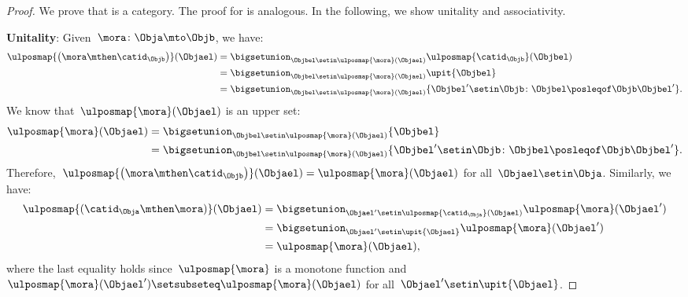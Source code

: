 \begin{proof}
    We prove that \UPos is a category.
    The proof for \LPos is analogous.
    In the following, we show unitality and associativity.

    \textbf{Unitality}:
    Given~$\mora\colon \Obja \mto \Objb$, we have:
    \begin{equation*}
        \begin{aligned}
            \ulposmap{\left( \mora \mthen \catid_\Objb\right)}(\Objael) & =\bigsetunion_{\Objbel\setin \ulposmap{\mora}(\Objael)}\ulposmap{\catid_\Objb}(\Objbel) \\
                                                                        & =\bigsetunion_{\Objbel\setin \ulposmap{\mora}(\Objael)}\upit\{\Objbel\} \\
                                                                        & =\bigsetunion_{\Objbel\setin \ulposmap{\mora}(\Objael)}\{\Objbel'\setin \Objb \colon \Objbel\posleqof\Objb \Objbel' \}.
        \end{aligned}
    \end{equation*}
    We know that~$\ulposmap{\mora}(\Objael)$ is an upper set:
    \begin{equation*}
        \begin{aligned}
            \ulposmap{\mora}(\Objael) & =\bigsetunion_{\Objbel\setin \ulposmap{\mora}(\Objael)}\{\Objbel\} \\
                                      & =\bigsetunion_{\Objbel\setin \ulposmap{\mora}(\Objael)}\{ \Objbel'\setin \Objb \colon \Objbel\posleqof\Objb \Objbel'\}.
        \end{aligned}
    \end{equation*}
    Therefore,~$\ulposmap{\left( \mora \mthen \catid_\Objb\right)}(\Objael)=\ulposmap{\mora}(\Objael)$ for all~$\Objael\setin \Obja$.
    Similarly, we have:
    \begin{equation*}
        \begin{aligned}
            \ulposmap{(\catid_\Obja \mthen \mora)}(\Objael) & =\bigsetunion_{\Objael'\setin \ulposmap{\catid_\Obja}(\Objael)}\ulposmap{\mora}(\Objael') \\
                                                            & =\bigsetunion_{\Objael'\setin \upit \{\Objael\}}\ulposmap{\mora}(\Objael') \\
                                                            & =\ulposmap{\mora}(\Objael),
        \end{aligned}
    \end{equation*}
    where the last equality holds since~$\ulposmap{\mora}$ is a monotone function and~$\ulposmap{\mora}(\Objael')\setsubseteq \ulposmap{\mora}(\Objael)$ for all~$\Objael'\setin \upit \{\Objael\}$.


\end{proof}
